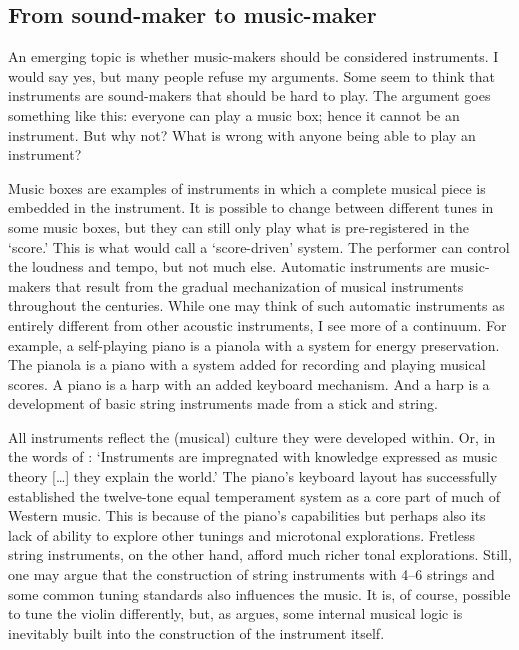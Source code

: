 \subsection{From sound-maker to music-maker}

An emerging topic is whether music-makers should be considered instruments. I would say yes, but many people refuse my arguments. Some seem to think that instruments are sound-makers that should be hard to play. The argument goes something like this: everyone can play a music box; hence it cannot be an instrument. But why not? What is wrong with anyone being able to play an instrument?

Music boxes are examples of instruments in which a complete musical piece is embedded in the instrument. It is possible to change between different tunes in some music boxes, but they can still only play what is pre-registered in the `score.' This is what \citet{rowe_interactive_1993} would call a `score-driven' system. The performer can control the loudness and tempo, but not much else. Automatic instruments are music-makers that result from the gradual mechanization of musical instruments throughout the centuries. While one may think of such automatic instruments as entirely different from other acoustic instruments, I see more of a continuum. For example, a self-playing piano is a pianola with a system for energy preservation. The pianola is a piano with a system added for recording and playing musical scores. A piano is a harp with an added keyboard mechanism. And a harp is a development of basic string instruments made from a stick and string.

All instruments reflect the (musical) culture they were developed within. Or, in the words of \citet{magnusson_ergomimesis_2018}: `Instruments are impregnated with knowledge expressed as music theory [\ldots] they explain the world.' The piano's keyboard layout has successfully established the twelve-tone equal temperament system as a core part of much of Western music. This is because of the piano's capabilities but perhaps also its lack of ability to explore other tunings and microtonal explorations. Fretless string instruments, on the other hand, afford much richer tonal explorations. Still, one may argue that the construction of string instruments with 4--6 strings and some common tuning standards also influences the music. It is, of course, possible to tune the violin differently, but, as \citet{de_souza_music_2017} argues, some internal musical logic is inevitably built into the construction of the instrument itself.

